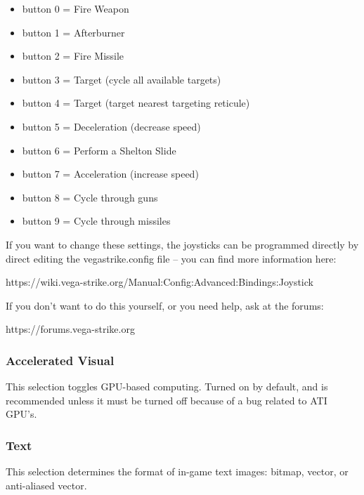 \documentclass{article}
\begin{document}
\begin{itemize}
\item  button 0 = Fire Weapon 

\item  button 1 = Afterburner 

\item  button 2 = Fire Missile 

\item  button 3 = Target (cycle all available targets) 

\item  button 4 = Target (target nearest targeting reticule) 

\item  button 5 = Deceleration (decrease speed) 

\item  button 6 = Perform a Shelton Slide 

\item  button 7 = Acceleration (increase speed) 

\item  button 8 = Cycle through guns 

\item  button 9 = Cycle through missiles 
\end{itemize}



If you want to change these settings, the joysticks can be programmed directly by direct editing the vegastrike.config file -- you can find more information here:

https://wiki.vega-strike.org/Manual:Config:Advanced:Bindings:Joystick

If you don't want to do this yourself, or you need help, ask at the forums:

https://forums.vega-strike.org


\subsubsection{Accelerated Visual}

This selection toggles GPU-based computing. Turned on by default, and is recommended unless it must be turned off because of a bug related to ATI GPU's.


\subsubsection{Text}

This selection determines the format of in-game text images: bitmap, vector, or anti-aliased vector.
\end{document}
